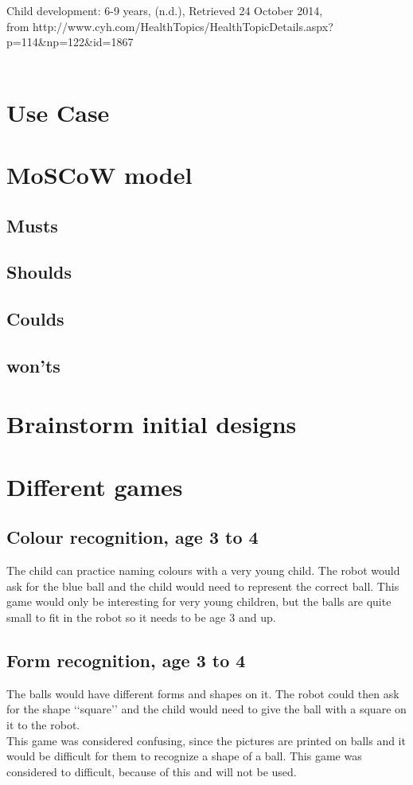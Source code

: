 \documentclass[11pt,twoside,a4paper]{report}
\begin{document}
Child development: 6-9 years, (n.d.), Retrieved 24 October 2014, \\from http://www.cyh.com/HealthTopics/HealthTopicDetails.aspx?p=114\&np=122\&id=1867\\
\\
\begin{appendices}
\chapter{Use Case}
\label{appendix:usecase}
\chapter{MoSCoW model}
\label{appendix:moscow}
\section{Musts}
\section{Shoulds}
\section{Coulds}
\section{won'ts}
\chapter{Brainstorm initial designs}
\label{appendix:brainstorm}
\chapter{Different games}
\section{Colour recognition, age 3 to 4}
The child can practice naming colours with a very young child. The robot would ask for the blue ball and the child would need to represent the correct ball. This game would only be interesting for very young children, but the balls are quite small to fit in the robot so it needs to be age 3 and up.
\section{Form recognition, age 3 to 4}
The balls would have different forms and shapes on it. The robot could then ask for the shape \lq\lq{}square\rq\rq{} and the child would need to give the ball with a square on it to the robot.\\
This game was considered confusing, since the pictures are printed on balls and it would be difficult for them to recognize a shape of a ball. This game was considered to difficult, because of this and will not be used.

\end{appendices}
\end{document}
